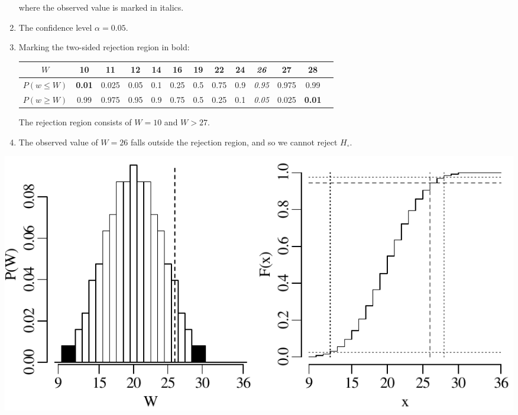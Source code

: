 \begin{enumerate}
  \noindent where the observed value is marked in italics.
  
\item The confidence level $\alpha = 0.05$.

\item Marking the two-sided rejection region in bold:
  
  \begin{center}
    \begin{tabular}{c|c@{\gap}c@{\gap}c@{\gap}c@{\gap}
        c@{\gap}c@{\gap}c@{\gap}c@{\gap}c@{\gap}c@{\gap}c@{\gap}c}
      $W$ & \textbf{10} & 11 & 12 & 14 & 16 & 19 & 22 & 24 & \textit{26} &
      27 & \textbf{28} \\ \hline
      $P(w\leq{W})$ & \textbf{0.01} & 0.025 & 0.05 & 0.1 & 0.25 &
      0.5 & 0.75 & 0.9 & \textit{0.95} & 0.975 & 0.99 \\
      $P(w\geq{W})$ & 0.99 & 0.975 & 0.95 & 0.9 & 0.75 & 0.5 &
      0.25 & 0.1 & \textit{0.05} & 0.025 & \textbf{0.01}
    \end{tabular}
  \end{center}

  The rejection region consists of $W={10}$ and $W>{27}$.

\item The observed value of $W=26$ falls outside the rejection region,
  and so we cannot reject $H_\circ$.

\end{enumerate}

\noindent\begin{minipage}[t][][b]{.6\textwidth}
  \includegraphics[width=\textwidth]{../figures/wilcox.pdf}\\
\end{minipage}
\begin{minipage}[t][][t]{.4\textwidth}
  \label{fig:wilcox}
\end{minipage}

